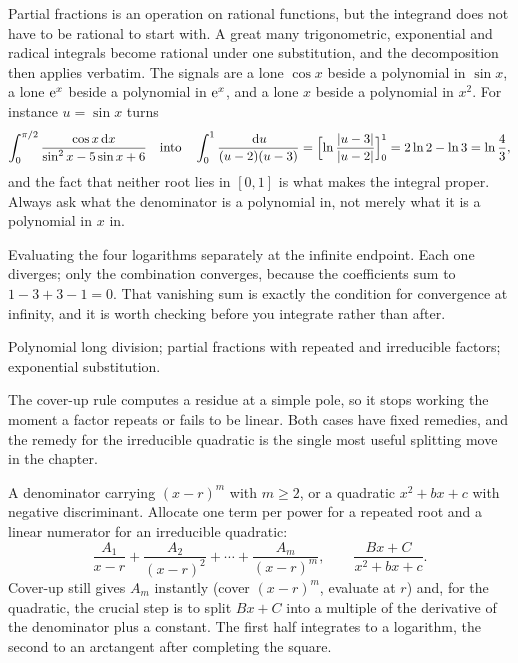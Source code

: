 \begin{keynote}
Partial fractions is an operation on rational functions, but the integrand does not have to be rational to start with. A great many trigonometric, exponential and radical integrals become rational under one substitution, and the decomposition then applies verbatim. The signals are a lone $\cos x$ beside a polynomial in $\sin x$, a lone $\mathrm{e}^x$ beside a polynomial in $\mathrm{e}^x$, and a lone $x$ beside a polynomial in $x^2$. For instance $u=\sin x$ turns
\[
\int_0^{\pi/2}\frac{\cos x\,\mathrm{d} x}{\sin^2x-5\sin x+6}
\quad\text{into}\quad
\int_0^{1}\frac{\,\mathrm{d} u}{(u-2)(u-3)}=\Bigl[\ln\frac{\left\lvert u-3\right\rvert}{\left\lvert u-2\right\rvert}\Bigr]_0^{1}=2\ln2-\ln3=\ln\frac43 ,
\]
and the fact that neither root lies in $[0,1]$ is what makes the integral proper. Always ask what the denominator is a polynomial in, not merely what it is a polynomial in $x$ in.
\end{keynote}

\begin{trap}
Evaluating the four logarithms separately at the infinite endpoint. Each one diverges; only the combination converges, because the coefficients sum to $1-3+3-1=0$. That vanishing sum is exactly the condition for convergence at infinity, and it is worth checking before you integrate rather than after.
\end{trap}

\begin{seealsob}Polynomial long division; partial fractions with repeated and irreducible factors; exponential substitution.\end{seealsob}

The cover-up rule computes a residue at a simple pole, so it stops working the moment a factor repeats or fails to be linear. Both cases have fixed remedies, and the remedy for the irreducible quadratic is the single most useful splitting move in the chapter.

\cue A denominator carrying $(x-r)^m$ with $m\geq2$, or a quadratic $x^2+bx+c$ with negative discriminant.
\method Allocate one term per power for a repeated root and a linear numerator for an irreducible quadratic:
\[
\frac{A_1}{x-r}+\frac{A_2}{(x-r)^2}+\cdots+\frac{A_m}{(x-r)^m},
\qquad
\frac{Bx+C}{x^2+bx+c}.
\]
Cover-up still gives $A_m$ instantly (cover $(x-r)^m$, evaluate at $r$) and, for the quadratic, the crucial step is to split $Bx+C$ into a multiple of the derivative of the denominator plus a constant. The first half integrates to a logarithm, the second to an arctangent after completing the square.

